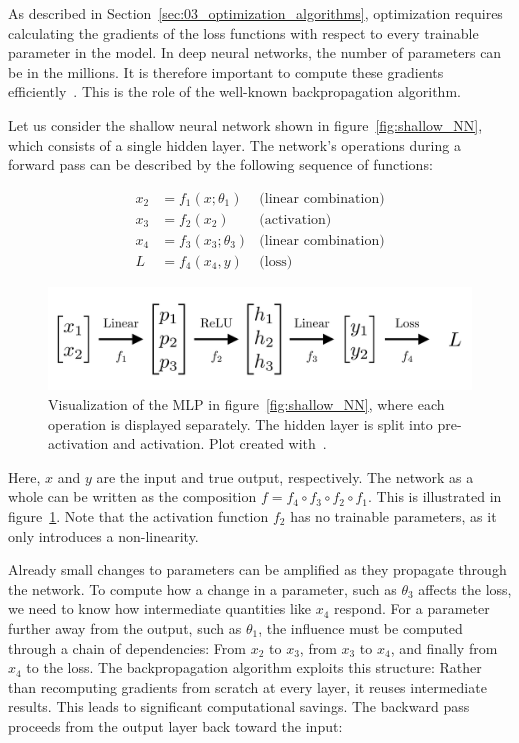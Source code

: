 As described in Section~\ref{sec:03_optimization_algorithms}, optimization requires calculating the gradients of the loss functions with respect to every trainable parameter in the model. In deep neural networks, the number of parameters can be in the millions. It is therefore important to compute these gradients efficiently~\cite{prince_understanding_2023}. This is the role of the well-known backpropagation algorithm. 

Let us consider the shallow neural network shown in  figure~\ref{fig:shallow_NN}, which consists of a single hidden layer. The network's operations during a forward pass can be described by the following sequence of functions:

\begin{align}
\label{eq:backprop_example_forwardpass}
	x_2 & = f_1(x; \theta_1) & \text{(linear combination)} \\ 
	x_3 & = f_2(x_2) & \text{(activation)} \\
	x_4 & = f_3(x_3; \theta_3) & \text{(linear combination)} \\
	L & = f_4(x_4, y) & \text{(loss)} 
\end{align}

\begin{figure}
    \centering
    \includegraphics[width=0.85\linewidth]{figures/04_transformer/Shallow_NN_operations.png}
    \caption{Visualization of the MLP in figure~\ref{fig:shallow_NN}, where each operation is displayed separately. The hidden layer is split into pre-activation and activation. Plot created with~\cite{the_manim_community_developers_manim_2025}.}
\label{fig:shallow_NN_operation}
\end{figure}


\noindent Here, $x$ and $y$ are the input and true output, respectively. The network as a whole can be written as the composition $f = f_4 \circ f_3 \circ f_2 \circ f_1$. This is illustrated in figure~\ref{fig:shallow_NN_operation}. Note that the activation function $f_2$ has no trainable parameters, as it only introduces a non-linearity. 

Already small changes to parameters can be amplified as they propagate through the network. To compute how a change in a parameter, such as $\theta_3$ affects the loss, we need to know how intermediate quantities like $x_4$ respond. 
For a parameter further away from the output, such as $\theta_1$, the influence must be computed through a chain of dependencies: From $x_2$ to $x_3$, from $x_3$ to $x_4$, and finally from $x_4$ to the loss. 
The backpropagation algorithm exploits this structure: Rather than recomputing gradients from scratch at every layer, it reuses intermediate results. This leads to significant computational savings. The backward pass proceeds from the output layer back toward the input:


